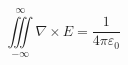\documentclass[12pt]{scrartcl}
\begin{document}
\begin{enumerate}[leftmargin=*]
    \begin{equation*}
        \iiint\limits_{-\infty}^{\infty} \nabla \times E = \frac{1}{4\pi \varepsilon_0}
    \end{equation*}


\end{enumerate}
\end{document}
